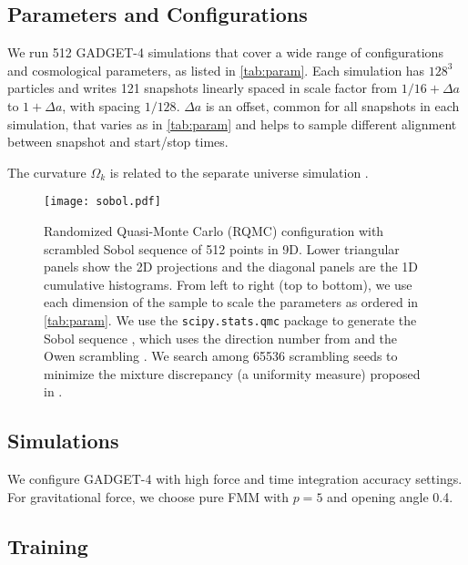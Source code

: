 \documentclass[usenatbib]{mnras}
\begin{document}
\subsection{Parameters and Configurations}

We run 512 GADGET-4 simulations that cover a wide range of
configurations and cosmological parameters, as listed in
\autoref{tab:param}.
Each simulation has $128^3$ particles and writes 121 snapshots linearly
spaced in scale factor from $1/16 + \Delta a$ to $1 + \Delta a$, with
spacing $1/128$.
$\Delta a$ is an offset, common for all snapshots in each simulation,
that varies as in \autoref{tab:param} and helps to sample different
alignment between snapshot and start/stop times.

The curvature $\Omega_k$ is related to the separate universe simulation
\citep{LiEtAl2014a, WagnerEtAl2015}.


\begin{figure*}
  \centering
  \texttt{[image: sobol.pdf]}
  \caption{Randomized Quasi-Monte Carlo (RQMC) configuration with
    scrambled Sobol sequence of 512 points in 9D.
    Lower triangular panels show the 2D projections and the diagonal
    panels are the 1D cumulative histograms.
    From left to right (top to bottom), we use each dimension of the
    sample to scale the parameters as ordered in \autoref{tab:param}.
    We use the \texttt{scipy.stats.qmc} package \citep{SciPy} to
    generate the Sobol sequence \citep{Sobol1967}, which uses the
    direction number from \citet{JoeKuo2008} and the Owen scrambling
    \citep{Owen1998}.
    We search among 65536 scrambling seeds to minimize the mixture
    discrepancy (a uniformity measure) proposed in \citet{Zhou2013MD}.
  }
  \label{fig:sobol}
\end{figure*}


\subsection{Simulations}

\citet{GADGET-4}

We configure GADGET-4 with high force and time integration accuracy
settings.
For gravitational force, we choose pure FMM with $p=5$ and opening angle
0.4.


\subsection{Training}
\end{document}
